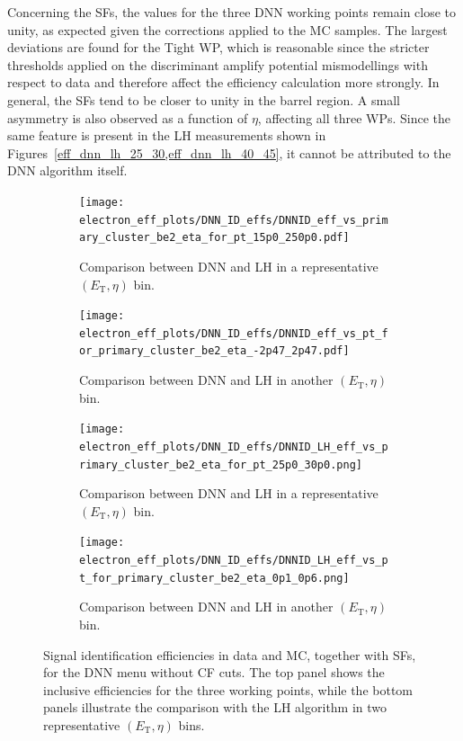 Concerning the SFs, the values for the three DNN working points remain close to unity, as expected given the corrections applied to the MC samples. The largest deviations are found for the Tight WP, which is reasonable since the stricter thresholds applied on the discriminant amplify potential mismodellings with respect to data and therefore affect the efficiency calculation more strongly. In general, the SFs tend to be closer to unity in the barrel region. A small asymmetry is also observed as a function of $\eta$, affecting all three WPs. Since the same feature is present in the LH measurements shown in Figures~\ref{eff_dnn_lh_25_30,eff_dnn_lh_40_45}, it cannot be attributed to the DNN algorithm itself.
\begin{figure}[htbp]
  \centering

  \begin{subfigure}{0.48\textwidth}
    \centering
    \texttt{[image: electron\_eff\_plots/DNN\_ID\_effs/DNNID\_eff\_vs\_primary\_cluster\_be2\_eta\_for\_pt\_15p0\_250p0.pdf]}
    \caption{Comparison between DNN and LH in a representative $(E_{\mathrm{T}},\eta)$ bin.}
    \label{fig:eff_inclusive_pt_dnn_id}
  \end{subfigure}
  \hfill
  \begin{subfigure}{0.48\textwidth}
    \centering
    \texttt{[image: electron\_eff\_plots/DNN\_ID\_effs/DNNID\_eff\_vs\_pt\_for\_primary\_cluster\_be2\_eta\_-2p47\_2p47.pdf]}
    \caption{Comparison between DNN and LH in another $(E_{\mathrm{T}},\eta)$ bin.}
    \label{fig:eff_inclusive_eta_dnn_id}
  \end{subfigure}

  \vspace{0.6cm}

  \begin{subfigure}{0.48\textwidth}
    \centering
    \texttt{[image: electron\_eff\_plots/DNN\_ID\_effs/DNNID\_LH\_eff\_vs\_primary\_cluster\_be2\_eta\_for\_pt\_25p0\_30p0.png]}
    \caption{Comparison between DNN and LH in a representative $(E_{\mathrm{T}},\eta)$ bin.}
    \label{fig:eff_dnn_lh_25_30}
  \end{subfigure}
  \hfill
  \begin{subfigure}{0.48\textwidth}
    \centering
    \texttt{[image: electron\_eff\_plots/DNN\_ID\_effs/DNNID\_LH\_eff\_vs\_pt\_for\_primary\_cluster\_be2\_eta\_0p1\_0p6.png]}
    \caption{Comparison between DNN and LH in another $(E_{\mathrm{T}},\eta)$ bin.}
    \label{fig:eff_dnn_lh_0p1_0p6}
  \end{subfigure}

  \caption{Signal identification efficiencies in data and MC, together with SFs, for the DNN menu without CF cuts. The top panel shows the inclusive efficiencies for the three working points, while the bottom panels illustrate the comparison with the LH algorithm in two representative $(E_{\mathrm{T}},\eta)$ bins.}
  \label{fig:eff_sfs_dnn_vs_lh}
\end{figure}

